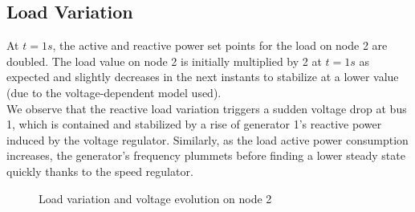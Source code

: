 \documentclass[a4paper, 12pt]{report}
\begin{document}
\newpage
\subsection{Load Variation}
\label{LoadVariation}

At $t=1s$, the active and reactive power set points for the load on node 2 are doubled. The load value on node 2 is initially multiplied by 2 at $t=1s$ as expected and slightly decreases in the next instants to stabilize at a lower value (due to the voltage-dependent model used). \\

We observe that the reactive load variation triggers a sudden voltage drop at bus 1, which is contained and stabilized by a rise of generator 1's reactive power induced by the voltage regulator. Similarly, as the load active power consumption increases, the generator's frequency plummets before finding a lower steady state quickly thanks to the speed regulator.\\

\begin{figure}[H]
\caption{Load variation and voltage evolution on node 2}
\end{figure}
\end{document}
